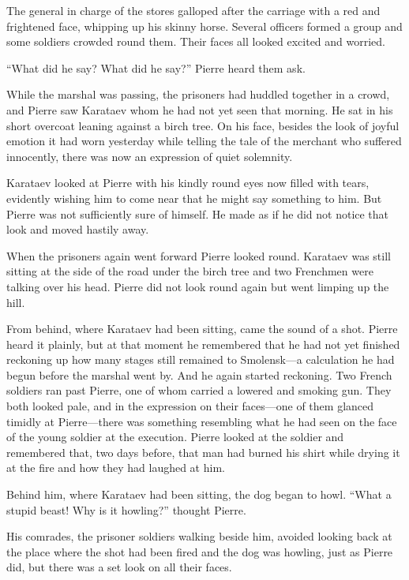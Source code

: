 The general in charge of the stores galloped after the carriage
with a red and frightened face, whipping up his skinny
horse. Several officers formed a group and some soldiers crowded
round them. Their faces all looked excited and worried.

``What did he say? What did he say?'' Pierre heard them ask.

While the marshal was passing, the prisoners had huddled together
in a crowd, and Pierre saw Karataev whom he had not yet seen that
morning. He sat in his short overcoat leaning against a birch
tree. On his face, besides the look of joyful emotion it had worn
yesterday while telling the tale of the merchant who suffered
innocently, there was now an expression of quiet solemnity.

Karataev looked at Pierre with his kindly round eyes now filled
with tears, evidently wishing him to come near that he might say
something to him. But Pierre was not sufficiently sure of
himself. He made as if he did not notice that look and moved
hastily away.

When the prisoners again went forward Pierre looked
round. Karataev was still sitting at the side of the road under
the birch tree and two Frenchmen were talking over his
head. Pierre did not look round again but went limping up the
hill.

From behind, where Karataev had been sitting, came the sound of a
shot.  Pierre heard it plainly, but at that moment he remembered
that he had not yet finished reckoning up how many stages still
remained to Smolensk---a calculation he had begun before the
marshal went by. And he again started reckoning. Two French
soldiers ran past Pierre, one of whom carried a lowered and
smoking gun. They both looked pale, and in the expression on
their faces---one of them glanced timidly at Pierre---there was
something resembling what he had seen on the face of the young
soldier at the execution. Pierre looked at the soldier and
remembered that, two days before, that man had burned his shirt
while drying it at the fire and how they had laughed at him.

Behind him, where Karataev had been sitting, the dog began to
howl.  ``What a stupid beast! Why is it howling?'' thought
Pierre.

His comrades, the prisoner soldiers walking beside him, avoided
looking back at the place where the shot had been fired and the
dog was howling, just as Pierre did, but there was a set look on
all their faces.


